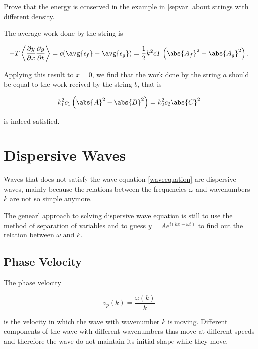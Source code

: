 \documentclass[a4paper,12pt]{report}
\begin{document}
{Prove that the energy is conserved in the example in \cref{sepvar} about strings with different density.}
{The average work done by the string is 

\begin{equation}
	-T \left< \frac{\partial y}{\partial x} \frac{\partial y}{\partial t}  \right> = c(\avg{\epsilon _{f} }- \avg{\epsilon _{g} }  ) = \frac{1}{2}k^2cT \left( \abs{A_{f} }^2- \abs{A_{g} }^2   \right).  
\end{equation}

Applying this result to \(x=0\), we find that the work done by the string \(a\) should be equal to the work recived by the string \(b\), that is 

\begin{equation}
	k_1^2c_1\left( \abs{A}^2- \abs{B}^2   \right)  = k_2^2c_2\abs{C}^2   
\end{equation}

is indeed satisfied.

} 

\section{Dispersive Waves}

Waves that does not satisfy the wave equation \cref{waveequation} are dispersive waves, mainly because the relations between the frequencies \(\omega \) and wavenumbers \(k\) are not so simple anymore. 

The genearl approach to solving dispersive wave equation is still to use the method of separation of variables and to guess \(y = A e^{i (kx-\omega t)} \) to find out the relation between \(\omega \text { and } k\).   

\subsection{Phase Velocity}

The phase velocity 

\begin{equation}
	v_{p}(k) = \frac{\omega (k)}{k}  
\end{equation}

is the velocity in which the wave with wavenumber \(k\) is moving. Different components of the wave with different wavenumbers thus move at different speeds and therefore the wave do not maintain its initial shape while they move.
\end{document}
